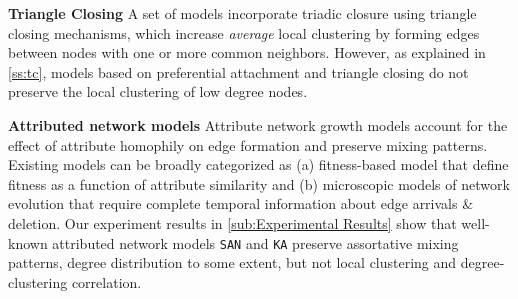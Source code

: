 
\textbf{Triangle Closing}
A set of models
\cite{holme2002growing,klemm2002highly,leskovec2008microscopic}
incorporate triadic closure using triangle closing mechanisms,
which increase \textit{average} local clustering by forming edges between nodes
with one or more common neighbors. However, as explained in \cref{ss:tc}, models
based on preferential attachment and triangle closing do not preserve the local
clustering of low degree nodes.

\textbf{Attributed network models}
Attribute network growth models \cite{de2013scale,karimi2017visibility,gong2012evolution,zheleva2009co}
account for the effect of attribute homophily on edge formation and preserve mixing patterns.
Existing models can be broadly categorized as (a) fitness-based model that define fitness as a function of
attribute similarity and (b) microscopic models of network evolution that require
complete temporal information about edge arrivals \& deletion. Our experiment
results in \cref{sub:Experimental Results} show that well-known attributed network models
\texttt{SAN} and \texttt{KA} preserve assortative
mixing patterns, degree distribution to some extent, but not local clustering
and degree-clustering correlation.

